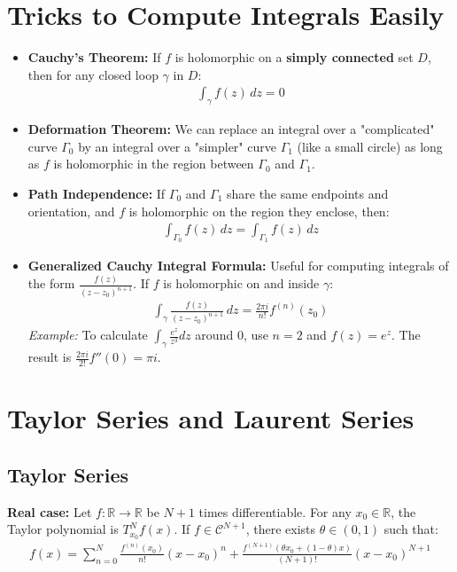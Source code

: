 \section{Tricks to Compute Integrals Easily}

\begin{itemize}
    \item \textbf{Cauchy's Theorem:} If $f$ is holomorphic on a \textbf{simply connected} set $D$, then for any closed loop $\gamma$ in $D$:
    \begin{align*}
        \int_{\gamma} f(z) \, dz = 0
    \end{align*}
    
    \item \textbf{Deformation Theorem:} We can replace an integral over a "complicated" curve $\Gamma_0$ by an integral over a "simpler" curve $\Gamma_1$ (like a small circle) as long as $f$ is holomorphic in the region between $\Gamma_0$ and $\Gamma_1$.
    
    \item \textbf{Path Independence:} If $\Gamma_0$ and $\Gamma_1$ share the same endpoints and orientation, and $f$ is holomorphic on the region they enclose, then:
    \begin{align*}
        \int_{\Gamma_0} f(z) \, dz = \int_{\Gamma_1} f(z) \, dz
    \end{align*}
    
    \item \textbf{Generalized Cauchy Integral Formula:} Useful for computing integrals of the form $\frac{f(z)}{(z-z_0)^{n+1}}$. If $f$ is holomorphic on and inside $\gamma$:
    \begin{align*}
        \int_\gamma \frac{f(z)}{(z-z_0)^{n+1}} \, dz = \frac{2 \pi i}{n!} f^{(n)}(z_0)
    \end{align*}
    \textit{Example:} To calculate $\int_\gamma \frac{e^z}{z^3} dz$ around $0$, use $n=2$ and $f(z)=e^z$. The result is $\frac{2\pi i}{2!} f''(0) = \pi i$.
\end{itemize}

\section{Taylor Series and Laurent Series}

\subsection{Taylor Series}
\textbf{Real case:} Let $f: \mathbb{R} \rightarrow \mathbb{R}$ be $N+1$ times differentiable. For any $x_0 \in \mathbb{R}$, the Taylor polynomial is $T^N_{x_0} f(x)$. If $f \in \mathcal{C}^{N+1}$, there exists $\theta \in (0,1)$ such that:
\begin{align*}
    f(x) = \sum_{n=0}^N \frac{f^{(n)}(x_0)}{n!}(x-x_0)^n + \frac{f^{(N+1)}(\theta x_0 + (1-\theta)x)}{(N+1)!}(x-x_0)^{N+1}
\end{align*}


